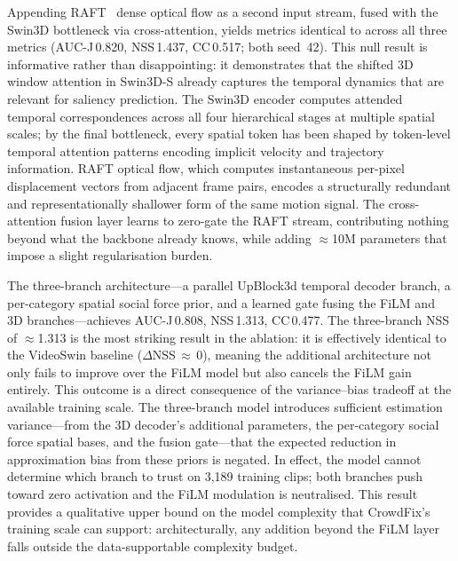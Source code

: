 \documentclass[twocolumn]{article}
\begin{document}
Appending RAFT~\citep{raft} dense optical flow as a second input stream,
fused with the Swin3D bottleneck via cross-attention, yields metrics
identical to \ourmodel{} across all three metrics (AUC-J\,0.820,
NSS\,1.437, CC\,0.517; both seed~42).  This null result is informative rather than
disappointing: it demonstrates that the shifted 3D window attention in
Swin3D-S already captures the temporal dynamics that are relevant for
saliency prediction.  The Swin3D encoder computes attended temporal
correspondences across all four hierarchical stages at multiple spatial
scales; by the final bottleneck, every spatial token has been shaped by
token-level temporal attention patterns encoding implicit velocity and
trajectory information.  RAFT optical flow, which computes instantaneous
per-pixel displacement vectors from adjacent frame pairs, encodes a
structurally redundant and representationally shallower form of the same
motion signal.  The cross-attention fusion layer learns to zero-gate the
RAFT stream, contributing nothing beyond what the backbone already knows,
while adding $\approx$10M parameters that impose a slight regularisation
burden.

The three-branch architecture---a parallel UpBlock3d temporal decoder
branch, a per-category spatial social force prior, and a learned
gate fusing the FiLM and 3D branches---achieves AUC-J\,0.808,
NSS\,1.313, CC\,0.477.  The three-branch NSS of $\approx$1.313 is the most striking result in
the ablation: it is effectively identical to the VideoSwin baseline
($\Delta$NSS\,$\approx$\,0), meaning the additional architecture not only
fails to improve over the FiLM model but also cancels the FiLM gain
entirely.  This outcome is a direct consequence of the variance--bias
tradeoff at the available training scale.  The three-branch model
introduces sufficient estimation variance---from the 3D decoder's
additional parameters, the per-category social force spatial bases, and
the fusion gate---that the expected reduction in approximation bias from
these priors is negated.  In effect, the model cannot determine which
branch to trust on 3,189 training clips; both branches push toward zero
activation and the FiLM modulation is neutralised.  This result provides
a qualitative upper bound on the model complexity that CrowdFix's
training scale can support: architecturally, any addition beyond the
FiLM layer falls outside the data-supportable complexity budget.
\end{document}
